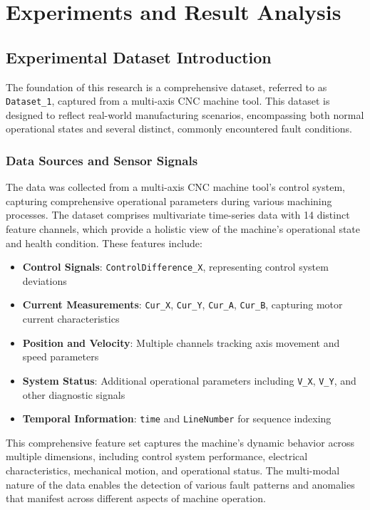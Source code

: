 \chapter{Experiments and Result Analysis}
\label{cha:experiments}

\section{Experimental Dataset Introduction}
\label{sec:experiments:dataset}

The foundation of this research is a comprehensive dataset, referred to as \texttt{Dataset\_1}, captured from a multi-axis CNC machine tool. This dataset is designed to reflect real-world manufacturing scenarios, encompassing both normal operational states and several distinct, commonly encountered fault conditions.

\subsection{Data Sources and Sensor Signals}
The data was collected from a multi-axis CNC machine tool's control system, capturing comprehensive operational parameters during various machining processes. The dataset comprises multivariate time-series data with 14 distinct feature channels, which provide a holistic view of the machine's operational state and health condition. These features include:

\begin{itemize}
    \item \textbf{Control Signals}: \texttt{ControlDifference\_X}, representing control system deviations
    \item \textbf{Current Measurements}: \texttt{Cur\_X}, \texttt{Cur\_Y}, \texttt{Cur\_A}, \texttt{Cur\_B}, capturing motor current characteristics
    \item \textbf{Position and Velocity}: Multiple channels tracking axis movement and speed parameters
    \item \textbf{System Status}: Additional operational parameters including \texttt{V\_X}, \texttt{V\_Y}, and other diagnostic signals
    \item \textbf{Temporal Information}: \texttt{time} and \texttt{LineNumber} for sequence indexing
\end{itemize}

This comprehensive feature set captures the machine's dynamic behavior across multiple dimensions, including control system performance, electrical characteristics, mechanical motion, and operational status. The multi-modal nature of the data enables the detection of various fault patterns and anomalies that manifest across different aspects of machine operation.

